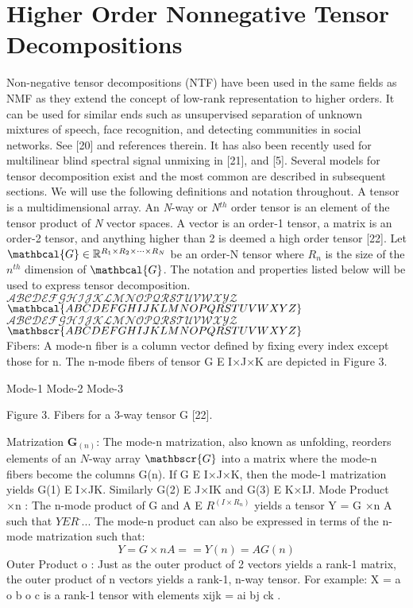 \section{Higher Order Nonnegative Tensor Decompositions}
Non-negative tensor decompositions (NTF) have been used in the same fields as NMF as they extend the concept of low-rank representation to higher orders.  It can be used for similar ends such as unsupervised separation of unknown mixtures of speech, face recognition, and detecting communities in social networks.  See [20] and references therein.  It has also been recently used for multilinear blind spectral signal unmixing in [21], and [5].  Several models for tensor decomposition exist and the most common are described in subsequent sections.  We will use the following definitions and notation throughout.
A tensor is a multidimensional array.  An \textit{N}-way or \textit{N}$^{th}$ order tensor is an element of the tensor product of \textit{N} vector spaces.  A vector is an order-1 tensor, a matrix is an order-2 tensor, and anything higher than 2 is deemed a high order tensor [22].
Let 
$\mathbcal{G} \in \mathbb{R}^{
	R_1 \times R_2 \times\cdots\times R_N
}$
be an order-N tensor where $R_n$ is the size of the $n^{th}$ dimension of $\mathbcal{G}$.  The notation and properties listed below will be used to express tensor decomposition.\\
$\mathcal{ABCDEFGHIJKLMNOPQRSTUVWXYZ}$\\
$\mathbcal{ABCDEFGHIJKLMNOPQRSTUVWXYZ}$\\
$\mathscr{ABCDEFGHIJKLMNOPQRSTUVWXYZ}$\\
$\mathbscr{ABCDEFGHIJKLMNOPQRSTUVWXYZ}$\\
Fibers: 	A mode-n fiber is a column vector defined by fixing every index except those for n.  The n-mode fibers of tensor G E I×J×K are depicted in Figure 3.

Mode-1		Mode-2	Mode-3

Figure 3.  Fibers for a 3-way tensor G [22].

Matrization $\mathbf{G}_{(n)}$:	The mode-n matrization, also known as unfolding, reorders elements of an $N$-way array $\mathbscr{G}$ into a matrix where the mode-n fibers become the columns G(n).  If G E I×J×K, then the mode-1 matrization yields G(1) E I×JK.  Similarly G(2) E J×IK and G(3) E K×IJ.
Mode Product ×n :	The n-mode product of G and A E $ R^(I×R_n )$ yields a tensor Y = G ×n A such that $Y E R^....$  The mode-n product can also be expressed in terms of the n-mode matrization such that:
\begin{equation}
	Y = G ×n A  ==  Y(n) = AG(n)
\end{equation}
Outer Product o :	Just as the outer product of 2 vectors yields a rank-1 matrix, the outer product of n vectors yields a rank-1, n-way tensor.  For example: X = a o b o c  is a rank-1 tensor with elements xijk = ai bj ck . 

